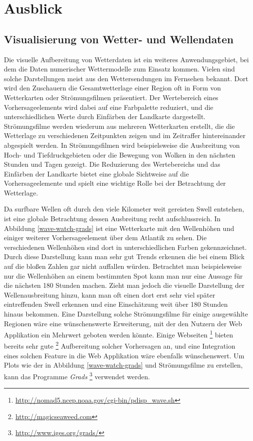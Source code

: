 \chapter{Ausblick}

\section{Visualisierung von Wetter- und Wellendaten}
Die visuelle Aufbereitung von Wetterdaten ist ein weiteres
Anwendungsgebiet, bei dem die Daten numerischer Wettermodelle zum
Einsatz kommen. Vielen sind solche Darstellungen meist aus den
Wettersendungen im Fernsehen bekannt. Dort wird den Zuschauern die
Gesamtwetterlage einer Region oft in Form von Wetterkarten oder
Strömungsfilmen präsentiert. Der Wertebereich eines Vorhersageelements
wird dabei auf eine Farbpalette reduziert, und die unterschiedlichen
Werte durch Einfärben der Landkarte dargestellt. Strömungsfilme werden
wiederum aus mehreren Wetterkarten erstellt, die die Wetterlage zu
verschiedenen Zeitpunkten zeigen und im Zeitraffer hintereinander
abgespielt werden. In Strömungsfilmen wird beispielsweise die
Ausbreitung von Hoch- und Tiefdruckgebieten oder die Bewegung von
Wolken in den nächsten Stunden und Tagen gezeigt. Die Reduzierung des
Wertebereichs und das Einfärben der Landkarte bietet eine globale
Sichtweise auf die Vorhersageelemente und spielt eine wichtige Rolle
bei der Betrachtung der Wetterlage.

Da surfbare Wellen oft durch den viele Kilometer weit gereisten Swell
entstehen, ist eine globale Betrachtung dessen Ausbreitung recht
aufschlussreich. In Abbildung \ref{wave-watch-grads} ist eine
Wetterkarte mit den Wellenhöhen und einiger weiterer Vorhersageelement
über dem Atlantik zu sehen. Die verschiedenen Wellenhöhen sind dort in
unterschiedlichen Farben gekennzeichnet. Durch diese Darstellung kann
man sehr gut Trends erkennen die bei einem Blick auf die bloßen Zahlen
gar nicht auffallen würden. Betrachtet man beispielsweise nur die
Wellenhöhen an einem bestimmten Spot kann man nur eine Aussage für die
nächsten 180 Stunden machen. Zieht man jedoch die visuelle Darstellung
der Wellenausbreitung hinzu, kann man oft einen dort erst sehr viel
später eintreffenden Swell erkennen und eine Einschätzung weit über
180 Stunden hinaus bekommen. Eine Darstellung solche Strömungsfilme
für einige ausgewählte Regionen wäre eine wünschenswerte Erweiterung,
mit der den Nutzern der Web Applikation ein Mehrwert geboten werden
könnte. Einige Webseiten
\footnote{\url{http://nomad5.ncep.noaa.gov/cgi-bin/pdisp_wave.sh}}
bieten bereits sehr gute \footnote{\url{http://magicseaweed.com}}
Aufbereitung solcher Vorhersagen an, und eine Integration eines
solchen Feature in die Web Applikation wäre ebenfalls
wünschenswert. Um Plots wie der in Abbildung \ref{wave-watch-grads}
und Strömungsfilme zu erstellen, kann das Programme \textit{Grads}
\footnote{\url{http://www.iges.org/grads/}} verwendet werden.

